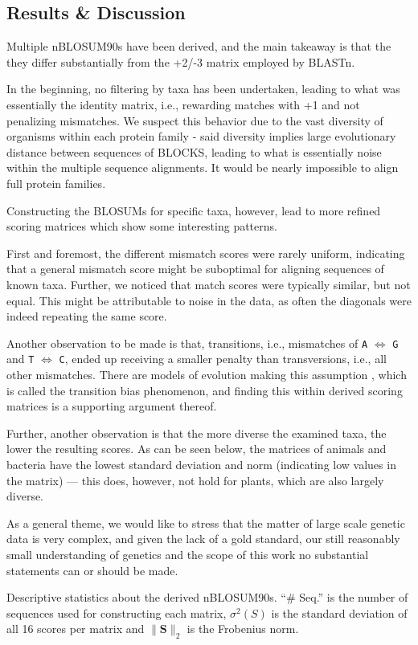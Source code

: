 \documentclass{article}
\begin{document}
\subsection{Results \& Discussion}	
	Multiple nBLOSUM90s have been derived, and the main takeaway is that the they differ substantially from the +2/-3 matrix employed by BLASTn. 	

	In the beginning, no filtering by taxa has been undertaken, leading 
	to what was essentially the identity matrix, i.e., rewarding matches
	with +1 and not penalizing mismatches. We suspect this behavior due to
	the vast diversity of organisms within each protein family - said
	diversity implies large evolutionary distance between sequences of
	BLOCKS, leading to what is essentially noise within the multiple
	sequence alignments. It would be nearly impossible to align full
	protein families.
	
	Constructing the BLOSUMs for specific taxa, however, lead to
	more refined scoring matrices which show some interesting patterns.

	First and foremost, the different mismatch scores were rarely uniform, indicating that a general mismatch score might be suboptimal for aligning sequences of known taxa. 	Further, we noticed that match scores were typically similar, but not
	equal. This might be attributable to noise in the data, as
	often the diagonals were indeed repeating the same score. 

	Another observation to be made is that, transitions,
	i.e., mismatches of \texttt{A} $\iff$ \texttt{G} and \texttt{T}
	$\iff$ \texttt{C}, ended up receiving a smaller penalty than
	transversions, i.e., all other mismatches. There are models of
	evolution making this assumption \cite{kimuraEstimationEvolutionaryDistances1981}, which is called
	the transition bias phenomenon, and
	finding this within derived scoring matrices is a supporting argument thereof.

	Further, another observation is that the more diverse the examined taxa,
	the lower the resulting scores. As can be seen below,
	the matrices of animals and bacteria have the lowest standard deviation and norm (indicating low values in the matrix) --- this does, however, not hold for plants, which are also largely diverse. 
	
As a general theme, we would like to stress that the matter of large scale
genetic data is very complex, and given the lack of a gold standard, our still
reasonably small understanding of genetics and the scope of this work no
substantial statements can or should be made.
	\begin{table}[h] 
		
		\caption{Descriptive statistics about the derived nBLOSUM90s.
			``\# Seq.'' is the number of sequences used for
			constructing each matrix, $\sigma^2(S)$
is the standard deviation of all 16 scores per matrix and $\| \mathbf S\|_2$ is the Frobenius norm.}
	\end{table}
\end{document}
